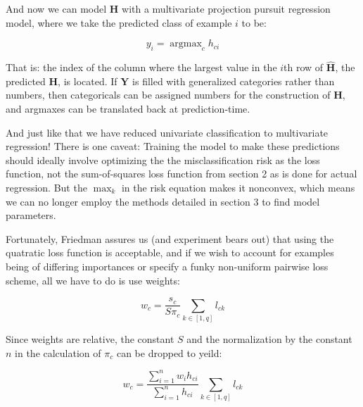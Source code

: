 \documentclass[12pt]{article}
\DeclareMathOperator*{\argmax}{argmax}
\begin{document}
And now we can model $\pmb{H}$ with a multivariate projection pursuit regression model, where we take the predicted class of example $i$ to be:

$$y_i = \argmax_c h_{ci} $$

That is: the index of the column where the largest value in the $i$th row of $\hat{\pmb{H}}$, the predicted $\pmb{H}$, is located. If $\pmb{Y}$ is filled with generalized categories rather than numbers, then categoricals can be assigned numbers for the construction of $\pmb{H}$, and argmaxes can be translated back at prediction-time.

And just like that we have reduced univariate classification to multivariate regression! There is one caveat: Training the model to make these predictions should ideally involve optimizing the the misclassification risk as the loss function, not the sum-of-squares loss function from section 2 as is done for actual regression. But the $\max_k$ in the risk equation makes it nonconvex, which means we can no longer employ the methods detailed in section 3 to find model parameters.

Fortunately, Friedman assures us (and experiment bears out) that using the quatratic loss function is acceptable, and if we wish to account for examples being of differing importances or specify a funky non-uniform pairwise loss scheme, all we have to do is use weights:

$$w_c = \frac{s_c}{S \pi_c} \sum_{k \in [1,q]} l_{ck}$$

Since weights are relative, the constant $S$ and the normalization by the constant $n$ in the calculation of $\pi_c$ can be dropped to yeild:

$$w_c = \frac{\sum_{i=1}^n w_i h_{ci}}{\sum_{i=1}^n h_{ci}} \sum_{k \in [1,q]} l_{ck}$$
\end{document}
